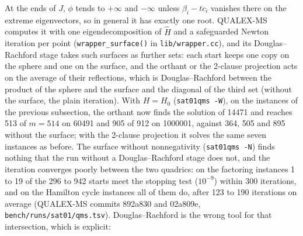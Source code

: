 \documentclass[11pt]{article}
\theoremstyle{definition}
\theoremstyle{remark}
\newcommand{\hH}{\hat{H}}
\begin{document}
At the ends of $J$, $\phi$ tends to $+\infty$ and $-\infty$ unless
$\beta_i-tc_i$ vanishes there on the extreme eigenvectors, so in general it
has exactly one root. QUALEX-MS computes it with one eigendecomposition of
$\hH$ and a safeguarded Newton iteration per point
(\texttt{wrapper\_surface()} in \texttt{lib/wrapper.cc}), and its
Douglas--Rachford stage takes such surfaces as further sets: each start keeps
one copy on the sphere and one on the surface, and the orthant or the
2-clause projection acts on the average of their reflections, which is
Douglas--Rachford between the product of the sphere and the surface and the
diagonal of the third set (without the surface, the plain iteration). With
$H=H_0$ (\texttt{sat01qms -W}), on the instances of the previous subsection,
the orthant now finds the solution of 14471 and reaches 513 of $m=514$ on
60491 and 905 of 912 on 1000001, against 364, 505 and 895 without the
surface; with the 2-clause projection it solves the same seven instances as
before. The surface without nonnegativity (\texttt{sat01qms -N}) finds
nothing that the run without a Douglas--Rachford stage does not, and the
iteration converges poorly between the two quadrics: on the factoring
instances 1 to 19 of the 296 to 942 starts meet the stopping test
($10^{-9}$) within 300 iterations, and on the Hamilton cycle instances all
of them do, after 123 to 190 iterations on average (QUALEX-MS commits
892a830 and 02a809e, \texttt{bench/runs/sat01/qms.tsv}). Douglas--Rachford is
the wrong tool for that intersection, which is explicit:
\end{document}
